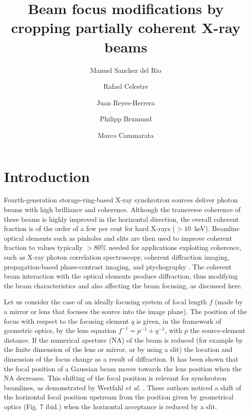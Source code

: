 \documentclass[doublecol]{epl2}
\title{Beam focus modifications by cropping partially coherent X-ray beams}
\author{Manuel Sanchez del Rio\inst{1} \and Rafael Celestre\inst{1} \and Juan Reyes-Herrera\inst{1} \and Philipp Brumund\inst{1} \and Marco Cammarata\inst{1}}
\institute{                    
  \inst{1} European Synchrotron Radiation Facility, 71 Avenue des Martyrs, 38000 Grenoble, France
}
\begin{document}

\maketitle

\section{Introduction}
\label{sec:introduction}
Fourth-generation storage-ring-based X-ray synchrotron sources deliver photon beams with high brilliance and coherence. Although the transverse coherence of these beams is highly improved in the horizontal direction, 
the overall coherent fraction is of the order of a few per cent for hard X-rays ($>10$~keV). Beamline optical elements such as pinholes and slits are then used to improve coherent fraction to values typically $>80 \%$ needed for applications exploiting coherence, such as X-ray photon correlation spectroscopy, coherent diffraction imaging, propagation-based phase-contrast imaging, and ptychography \cite{paganin_book}. The coherent beam interaction with the optical elements produce diffraction, thus modifying the beam characteristics and also affecting the beam focusing, as discussed here.

Let us consider the case of an ideally focusing system of focal length $f$ (made by a mirror or lens that focuses the source into the image plane). The position of the focus with respect to the focusing element $q$ is given, in the framework of geometric optics, by the lens equation $f^{-1}=p^{-1}+q^{-1}$, with $p$ the source-element distance. If the numerical aperture (NA) of the beam is reduced (for example by the finite dimension of the lens or mirror, or by using a slit) the location and dimension of the focus change as a result of diffraction. It has been shown \cite{Tanaka:85} that the focal position of a Gaussian beam moves towards the lens position when the NA decreases. This shifting of the focal position is relevant for synchrotron beamlines, as demonstrated by Westfahl {\it et al.} \cite{westfahl}. These authors noticed a shift of the horizontal focal position upstream from the position given by geometrical optics (Fig. 7 ibid.) when the horizontal acceptance is reduced by a slit. 
\end{document}
